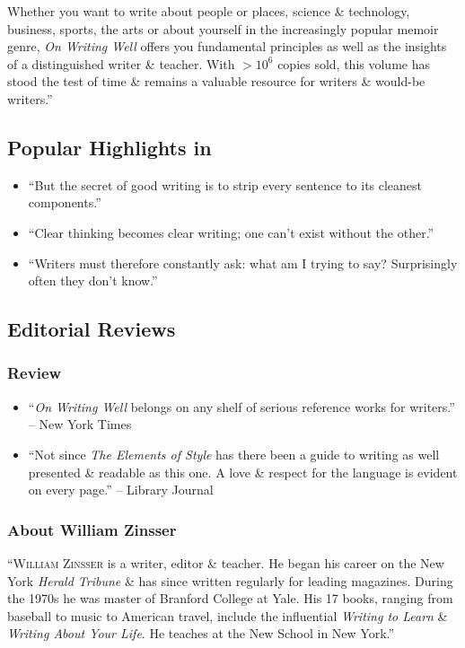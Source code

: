\documentclass[oneside]{book}
\numberwithin{equation}{section}
\begin{document}
Whether you want to write about people or places, science \& technology, business, sports, the arts or about yourself in the increasingly popular memoir genre, \textit{On Writing Well} offers you fundamental principles as well as the insights of a distinguished writer \& teacher. With $>10^6$ copies sold, this volume has stood the test of time \& remains a valuable resource for writers \& would-be writers.''

\subsection*{Popular Highlights in \cite{Zinsser2016}}
\begin{itemize}
	\item ``But the secret of good writing is to strip every sentence to its cleanest components.''
	\item ``Clear thinking becomes clear writing; one can't exist without the other.''
	\item ``Writers must therefore constantly ask: what am I trying to say? Surprisingly often they don't know.''
\end{itemize}

\subsection*{Editorial Reviews}

\subsubsection*{Review}
\begin{itemize}
	\item ``\textit{On Writing Well} belongs on any shelf of serious reference works for writers.'' -- New York Times
	\item ``Not since \textit{The Elements of Style} has there been a guide to writing as well presented \& readable as this one. A love \& respect for the language is evident on every page.'' -- Library Journal
\end{itemize}

\subsubsection*{About William Zinsser}
``\textsc{William Zinsser} is a writer, editor \& teacher. He began his career on the New York \textit{Herald Tribune} \& has since written regularly for leading magazines. During the 1970s he was master of Branford College at Yale. His 17 books, ranging from baseball to music to American travel, include the influential \textit{Writing to Learn} \& \textit{Writing About Your Life}. He teaches at the New School in New York.''
\end{document}
